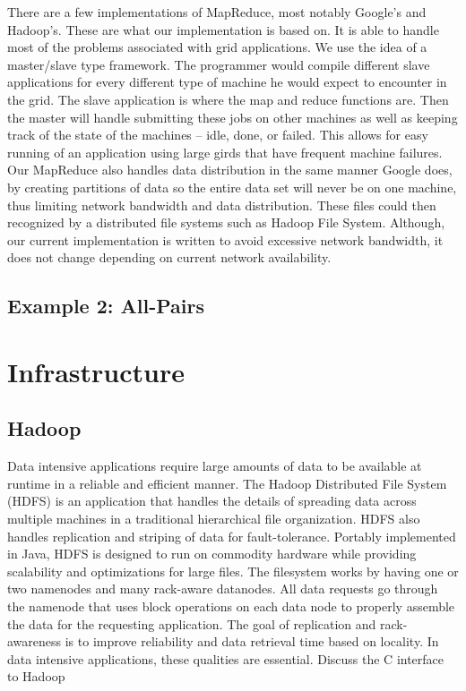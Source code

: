\documentclass{rspublic}
\begin{document}
There are a few implementations of MapReduce, most notably Google's and
Hadoop's.  These are what our implementation is based on.  It is able
to handle most of the problems associated with grid applications.  We use
the idea of a master/slave type framework.  The programmer would compile
different slave applications for every different type of machine he 
would expect to encounter in the grid.  The slave application is
where the map and reduce functions are.  Then the master will handle
submitting these jobs on other machines as well as keeping track of
the state of the machines -- idle, done, or failed.  This allows for
easy running of an application using large girds that have frequent
machine failures.  Our MapReduce also handles data distribution in the
same manner Google does, by creating partitions of data so the entire
data set will never be on one machine, thus limiting network bandwidth
and data distribution.  These files could then recognized by a
distributed file systems such as Hadoop File System.  Although, our
current implementation is written to avoid excessive network
bandwidth, it does not change depending on current network
availability.


\subsection{Example 2: All-Pairs}

\section*{Infrastructure}

\subsection*{Hadoop}

Data intensive applications require large amounts of data to be available 
at runtime in a reliable and efficient manner.  The Hadoop Distributed File System 
(HDFS) is an application that handles the details of spreading data across multiple 
machines in a traditional hierarchical file organization.  HDFS also handles replication 
and striping of data for fault-tolerance.  Portably implemented in Java, HDFS is designed to 
run on commodity hardware while providing scalability and optimizations for large files.  
The filesystem works by having one or two namenodes and many rack-aware datanodes.  
All data requests go through the namenode that uses block operations on each data 
node to properly assemble the data for the requesting application.  The goal 
of replication and rack-awareness is to improve reliability and data retrieval 
time based on locality.  In data intensive applications, these qualities are essential. 
Discuss the C interface to Hadoop
\end{document}
